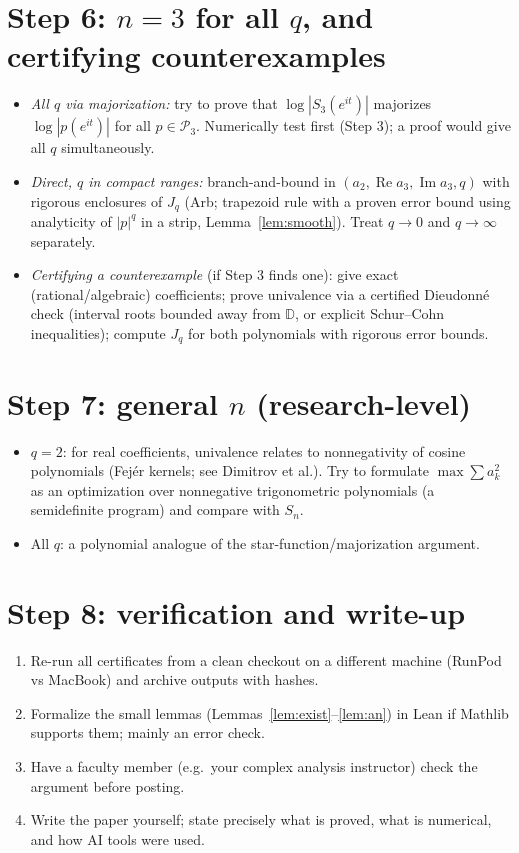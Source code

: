 \documentclass[11pt]{article}
\newcommand{\D}{\mathbb{D}}
\renewcommand{\Re}{\operatorname{Re}}
\renewcommand{\Im}{\operatorname{Im}}
\begin{document}
\section{Step 6: $n=3$ for all $q$, and certifying counterexamples}

\begin{itemize}[leftmargin=*]
\item \emph{All $q$ via majorization:} try to prove that $\log|S_3(e^{it})|$ majorizes $\log|p(e^{it})|$ for all $p\in\mathcal P_3$. Numerically test first (Step 3); a proof would give all $q$ simultaneously.
\item \emph{Direct, $q$ in compact ranges:} branch-and-bound in $(a_2,\Re a_3,\Im a_3,q)$ with rigorous enclosures of $J_q$ (Arb; trapezoid rule with a proven error bound using analyticity of $|p|^q$ in a strip, Lemma~\ref{lem:smooth}). Treat $q\to0$ and $q\to\infty$ separately.
\item \emph{Certifying a counterexample} (if Step 3 finds one): give exact (rational/algebraic) coefficients; prove univalence via a certified Dieudonné check (interval roots bounded away from $\D$, or explicit Schur--Cohn inequalities); compute $J_q$ for both polynomials with rigorous error bounds.
\end{itemize}

\section{Step 7: general $n$ (research-level)}
\begin{itemize}[nosep]
\item $q=2$: for real coefficients, univalence relates to nonnegativity of cosine polynomials (Fejér kernels; see Dimitrov et al.). Try to formulate $\max\sum a_k^2$ as an optimization over nonnegative trigonometric polynomials (a semidefinite program) and compare with $S_n$.
\item All $q$: a polynomial analogue of the star-function/majorization argument.
\end{itemize}

\section{Step 8: verification and write-up}
\begin{enumerate}[nosep]
\item Re-run all certificates from a clean checkout on a different machine (RunPod vs MacBook) and archive outputs with hashes.
\item Formalize the small lemmas (Lemmas~\ref{lem:exist}--\ref{lem:an}) in Lean if Mathlib supports them; mainly an error check.
\item Have a faculty member (e.g.\ your complex analysis instructor) check the argument before posting.
\item Write the paper yourself; state precisely what is proved, what is numerical, and how AI tools were used.
\end{enumerate}
\end{document}
